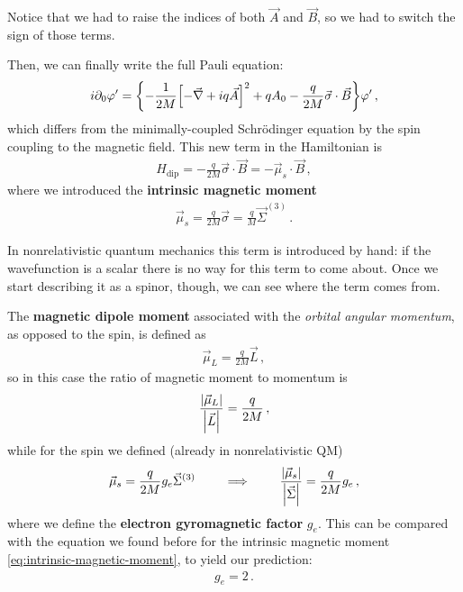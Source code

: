 \documentclass[main.tex]{subfiles}
\begin{document}
Notice that we had to raise the indices of both \(\vec{A}\) and \(\vec{B}\), so we had to switch the sign of those terms.

Then, we can finally write the full Pauli equation: 
%
\begin{align}
i \partial_0 \varphi ' = \qty{- \frac{1}{2M} \qty[- \vec{\nabla} + i q \vec{A}]^2  + q A_0 - \frac{q}{2M} \vec{\sigma} \cdot \vec{B} } \varphi '
\,,
\end{align}
%
which differs from the minimally-coupled Schrödinger equation by the spin coupling to the magnetic field. 
This new term in the Hamiltonian is 
%
\begin{align}
H _{\text{dip}}= - \frac{q}{2M} \vec{\sigma} \cdot \vec{B} = - \vec{\mu}_{s} \cdot \vec{B}
\,,
\end{align}
%
where we introduced the \textbf{intrinsic magnetic moment} 
%
\begin{align} \label{eq:intrinsic-magnetic-moment}
\vec{\mu}_{s} = \frac{q}{2M} \vec{\sigma} = \frac{q}{M} \vec{\Sigma}^{(3)}
\,.
\end{align}

In nonrelativistic quantum mechanics this term is introduced by hand: if the wavefunction is a scalar there is no way for this term to come about. Once we start describing it as a spinor, though, we can see where the term comes from.

The \textbf{magnetic dipole moment} associated with the \emph{orbital angular momentum}, as opposed to the spin, is defined as 
%
\begin{align}
\vec{\mu}_{L} = \frac{q}{2M } \vec{L}
\,,
\end{align}
%
so in this case the ratio of magnetic moment to momentum is 
%
\begin{align}
\frac{\abs{\vec{\mu}_{L}}}{\abs{\vec{L}}} = \frac{q}{2M}
\,,
\end{align}
%
while for the spin we defined (already in nonrelativistic QM) 
%
\begin{align}
\vec{\mu}_{s} = \frac{q}{2M} g_e \vec{\Sigma}^{(3)}
\qquad \implies \qquad
\frac{\abs{\vec{\mu}_{s}}}{\abs{\vec{\Sigma}}} = \frac{q}{2M} g_{e} 
\,,
\end{align}
%
where we define the \textbf{electron gyromagnetic factor} \(g_e\).
This can be compared with the equation we found before for the intrinsic magnetic moment \eqref{eq:intrinsic-magnetic-moment}, to yield our prediction: 
%
\begin{align}
g_e = 2
\,.
\end{align}
\end{document}
